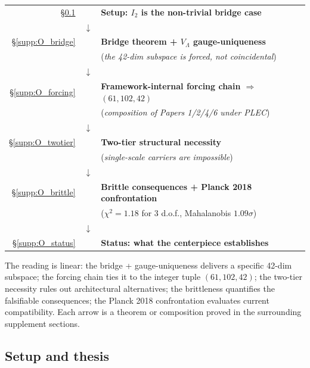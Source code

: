 \documentclass[11pt]{article}
\theoremstyle{plain}
\theoremstyle{definition}
\theoremstyle{remark}
\begin{document}
\begin{apfbox}[title={The centerpiece in one reading}]
\noindent
\begin{center}
\begin{tabular}{r c l}
\S\ref{supp:O_thesis} & & \textbf{Setup: $I_2$ is the non-trivial bridge case} \\
 & $\downarrow$ & \\
\S\ref{supp:O_bridge} & & \textbf{Bridge theorem + $V_\Lambda$ gauge-uniqueness} \\
 & & (\emph{the 42-dim subspace is forced, not coincidental}) \\
 & $\downarrow$ & \\
\S\ref{supp:O_forcing} & & \textbf{Framework-internal forcing chain $\Rightarrow$ $(61, 102, 42)$} \\
 & & (\emph{composition of Papers 1/2/4/6 under PLEC}) \\
 & $\downarrow$ & \\
\S\ref{supp:O_twotier} & & \textbf{Two-tier structural necessity} \\
 & & (\emph{single-scale carriers are impossible}) \\
 & $\downarrow$ & \\
\S\ref{supp:O_brittle} & & \textbf{Brittle consequences + Planck 2018 confrontation} \\
 & & ($\chi^2 = 1.18$ for 3 d.o.f., Mahalanobis $1.09\sigma$) \\
 & $\downarrow$ & \\
\S\ref{supp:O_status} & & \textbf{Status: what the centerpiece establishes}
\end{tabular}
\end{center}

\smallskip

\noindent The reading is linear: the bridge + gauge-uniqueness delivers a specific 42-dim subspace; the forcing chain ties it to the integer tuple $(61, 102, 42)$; the two-tier necessity rules out architectural alternatives; the brittleness quantifies the falsifiable consequences; the Planck 2018 confrontation evaluates current compatibility.  Each arrow is a theorem or composition proved in the surrounding supplement sections.
\end{apfbox}

\bigskip

\subsection{Setup and thesis}\label{supp:O_thesis}
\end{document}

